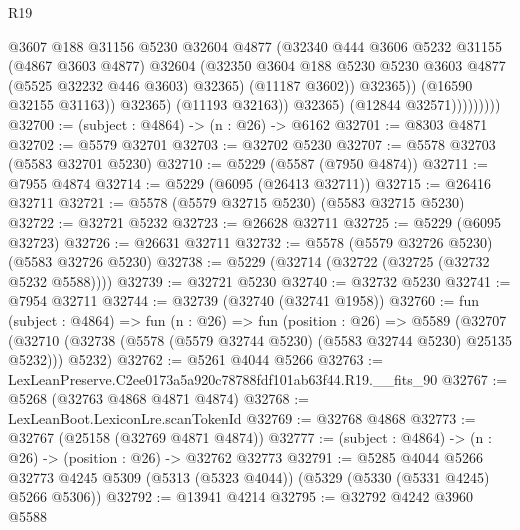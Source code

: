 \begin{lexlean}{R19}
\begin{coremodule}
                                @3607
                                @188
                                @31156
                                @5230
                                @32604
                                @4877
                                (@32340
                                  @444
                                  @3606
                                  @5232
                                  @31155
                                  (@4867 @3603 @4877)
                                  @32604
                                  (@32350
                                    @3604
                                    @188
                                    @5230
                                    @5230
                                    @3603
                                    @4877
                                    (@5525 @32232 @446 @3603)
                                    @32365)
                                  (@11187 @3602))
                                @32365))
                            (@16590 @32155 @31163))
                          @32365)
                        (@11193 @32163))
                      @32365)
                    (@12844 @32571)))))))))
@32700 := (subject : @4864) -> (n : @26) -> @6162
@32701 := @8303 @4871
@32702 := @5579 @32701
@32703 := @32702 @5230
@32707 := @5578 @32703 (@5583 @32701 @5230)
@32710 := @5229 (@5587 (@7950 @4874))
@32711 := @7955 @4874
@32714 := @5229 (@6095 (@26413 @32711))
@32715 := @26416 @32711
@32721 := @5578 (@5579 @32715 @5230) (@5583 @32715 @5230)
@32722 := @32721 @5232
@32723 := @26628 @32711
@32725 := @5229 (@6095 @32723)
@32726 := @26631 @32711
@32732 := @5578 (@5579 @32726 @5230) (@5583 @32726 @5230)
@32738 := @5229 (@32714 (@32722 (@32725 (@32732 @5232 @5588))))
@32739 := @32721 @5230
@32740 := @32732 @5230
@32741 := @7954 @32711
@32744 := @32739 (@32740 (@32741 @1958))
@32760 := fun (subject : @4864) =>
  fun (n : @26) =>
  fun (position : @26) =>
  @5589
    (@32707 (@32710 (@32738 (@5578 (@5579 @32744 @5230) (@5583 @32744 @5230) @25135 @5232))) @5232)
@32762 := @5261 @4044 @5266
@32763 := LexLeanPreserve.C2ee0173a5a920c78788fdf101ab63f44.R19.__fits_90
@32767 := @5268 (@32763 @4868 @4871 @4874)
@32768 := LexLeanBoot.LexiconLre.scanTokenId
@32769 := @32768 @4868
@32773 := @32767 (@25158 (@32769 @4871 @4874))
@32777 := (subject : @4864) -> (n : @26) -> (position : @26) -> @32762 @32773
@32791 := @5285
    @4044
    @5266
    @32773
    @4245
    @5309
    (@5313 (@5323 @4044))
    (@5329 (@5330 (@5331 @4245) @5266 @5306))
@32792 := @13941 @4214
@32795 := @32792 @4242 @3960 @5588

\end{coremodule}
\end{lexlean}
